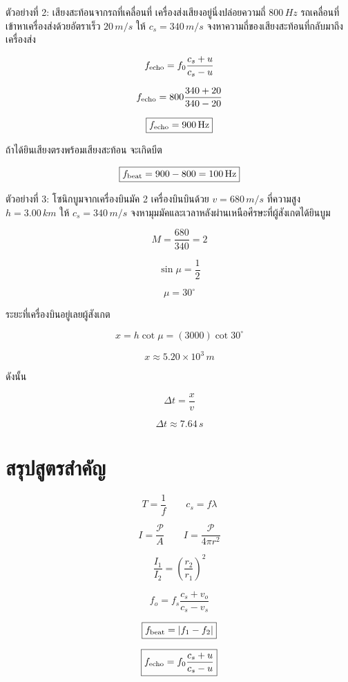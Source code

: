 \begin{examplebox}{ตัวอย่างที่ 2: เสียงสะท้อนจากรถที่เคลื่อนที่}
เครื่องส่งเสียงอยู่นิ่งปล่อยความถี่ $800\,\si{Hz}$ รถเคลื่อนที่เข้าหาเครื่องส่งด้วยอัตราเร็ว $20\,\si{m/s}$ ให้ $c_s=340\,\si{m/s}$ จงหาความถี่ของเสียงสะท้อนที่กลับมาถึงเครื่องส่ง

\[
f_{\rm echo}
=f_0\frac{c_s+u}{c_s-u}
\]

\[
f_{\rm echo}
=800\frac{340+20}{340-20}
\]

\[
\boxed{f_{\rm echo}=900\,\si{Hz}}
\]

ถ้าได้ยินเสียงตรงพร้อมเสียงสะท้อน จะเกิดบีต

\[
\boxed{f_{\rm beat}=900-800=100\,\si{Hz}}
\]
\end{examplebox}

\begin{examplebox}{ตัวอย่างที่ 3: โซนิกบูมจากเครื่องบินมัค 2}
เครื่องบินบินด้วย $v=680\,\si{m/s}$ ที่ความสูง $h=3.00\,\si{km}$ ให้ $c_s=340\,\si{m/s}$ จงหามุมมัคและเวลาหลังผ่านเหนือศีรษะที่ผู้สังเกตได้ยินบูม

\[
M=\frac{680}{340}=2
\]

\[
\sin\mu=\frac{1}{2}
\]

\[
\boxed{\mu=30^\circ}
\]

ระยะที่เครื่องบินอยู่เลยผู้สังเกต

\[
x=h\cot\mu
=(3000)\cot30^\circ
\]

\[
x\approx5.20\times10^3\,\si{m}
\]

ดังนั้น

\[
\Delta t=\frac{x}{v}
\]

\[
\boxed{\Delta t\approx7.64\,\si{s}}
\]
\end{examplebox}

\section{สรุปสูตรสำคัญ}

\begin{tcolorbox}[title={คลื่นและความเข้มเสียง}]
\[
\boxed{T=\frac{1}{f}}
\qquad
\boxed{c_s=f\lambda}
\]

\[
\boxed{I=\frac{\mathcal P}{A}}
\qquad
\boxed{I=\frac{\mathcal P}{4\pi r^2}}
\]

\[
\boxed{\frac{I_1}{I_2}=\left(\frac{r_2}{r_1}\right)^2}
\]
\end{tcolorbox}

\begin{tcolorbox}[title={ดอปเพลอร์ บีต และเสียงสะท้อนจากวัตถุเคลื่อนที่}]
\[
\boxed{f_o=f_s\frac{c_s+v_o}{c_s-v_s}}
\]

\[
\boxed{f_{\rm beat}=|f_1-f_2|}
\]

\[
\boxed{
f_{\rm echo}=f_0\frac{c_s+u}{c_s-u}
}
\]
\end{tcolorbox}

